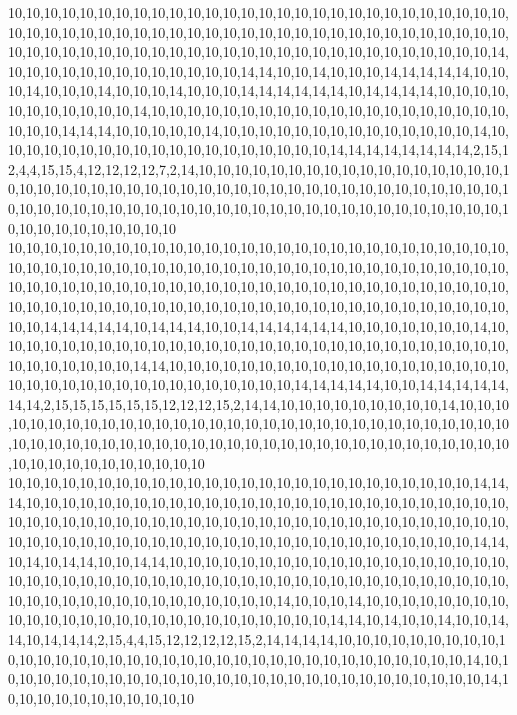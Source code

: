 10,10,10,10,10,10,10,10,10,10,10,10,10,10,10,10,10,10,10,10,10,10,10,10,10,10,10,10,10,10,10,10,10,10,10,10,10,10,10,10,10,10,10,10,10,10,10,10,10,10,10,10,10,10,10,10,10,10,10,10,10,10,10,10,10,10,10,10,10,10,10,10,10,10,10,10,10,10,10,10,10,10,10,14,10,10,10,10,10,10,10,10,10,10,10,10,10,14,14,10,10,14,10,10,10,14,14,14,14,14,10,10,10,14,10,10,10,14,10,10,10,14,10,10,10,14,14,14,14,14,14,10,14,14,14,14,10,10,10,10,10,10,10,10,10,10,10,14,10,10,10,10,10,10,10,10,10,10,10,10,10,10,10,10,10,10,10,10,10,10,10,14,14,14,10,10,10,10,10,14,10,10,10,10,10,10,10,10,10,10,10,10,10,10,14,10,10,10,10,10,10,10,10,10,10,10,10,10,10,10,10,10,10,10,14,14,14,14,14,14,14,14,2,15,12,4,4,15,15,4,12,12,12,12,7,2,14,10,10,10,10,10,10,10,10,10,10,10,10,10,10,10,10,10,10,10,10,10,10,10,10,10,10,10,10,10,10,10,10,10,10,10,10,10,10,10,10,10,10,10,10,10,10,10,10,10,10,10,10,10,10,10,10,10,10,10,10,10,10,10,10,10,10,10,10,10,10,10,10,10,10,10,10,10,10,10,10,10,10,10
10,10,10,10,10,10,10,10,10,10,10,10,10,10,10,10,10,10,10,10,10,10,10,10,10,10,10,10,10,10,10,10,10,10,10,10,10,10,10,10,10,10,10,10,10,10,10,10,10,10,10,10,10,10,10,10,10,10,10,10,10,10,10,10,10,10,10,10,10,10,10,10,10,10,10,10,10,10,10,10,10,10,10,10,10,10,10,10,10,10,10,10,10,10,10,10,10,10,10,10,10,10,10,10,10,10,10,10,10,10,10,10,10,10,14,14,14,14,14,10,14,14,14,10,10,14,14,14,14,14,14,10,10,10,10,10,10,10,14,10,10,10,10,10,10,10,10,10,10,10,10,10,10,10,10,10,10,10,10,10,10,10,10,10,10,10,10,10,10,10,10,10,10,10,10,14,14,10,10,10,10,10,10,10,10,10,10,10,10,10,10,10,10,10,10,10,10,10,10,10,10,10,10,10,10,10,10,10,10,10,10,10,14,14,14,14,14,10,10,14,14,14,14,14,14,14,2,15,15,15,15,15,15,12,12,12,15,2,14,14,10,10,10,10,10,10,10,10,10,14,10,10,10,10,10,10,10,10,10,10,10,10,10,10,10,10,10,10,10,10,10,10,10,10,10,10,10,10,10,10,10,10,10,10,10,10,10,10,10,10,10,10,10,10,10,10,10,10,10,10,10,10,10,10,10,10,10,10,10,10,10,10,10,10,10,10,10,10,10,10
10,10,10,10,10,10,10,10,10,10,10,10,10,10,10,10,10,10,10,10,10,10,10,10,10,10,14,14,14,10,10,10,10,10,10,10,10,10,10,10,10,10,10,10,10,10,10,10,10,10,10,10,10,10,10,10,10,10,10,10,10,10,10,10,10,10,10,10,10,10,10,10,10,10,10,10,10,10,10,10,10,10,10,10,10,10,10,10,10,10,10,10,10,10,10,10,10,10,10,10,10,10,10,10,10,10,10,10,10,10,14,14,10,14,10,14,14,10,10,14,14,10,10,10,10,10,10,10,10,10,10,10,10,10,10,10,10,10,10,10,10,10,10,10,10,10,10,10,10,10,10,10,10,10,10,10,10,10,10,10,10,10,10,10,10,10,10,10,10,10,10,10,10,10,10,10,10,10,10,10,10,10,10,14,10,10,10,14,10,10,10,10,10,10,10,10,10,10,10,10,10,10,10,10,10,10,10,10,10,10,10,10,10,10,14,14,10,14,10,10,14,10,10,14,14,10,14,14,14,2,15,4,4,15,12,12,12,12,15,2,14,14,14,14,10,10,10,10,10,10,10,10,10,10,10,10,10,10,10,10,10,10,10,10,10,10,10,10,10,10,10,10,10,10,10,10,10,10,10,14,10,10,10,10,10,10,10,10,10,10,10,10,10,10,10,10,10,10,10,10,10,10,10,10,10,10,10,10,14,10,10,10,10,10,10,10,10,10,10,10
